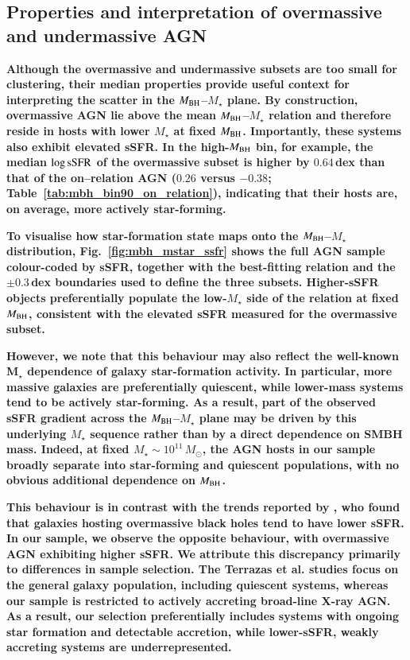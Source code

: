\documentclass{aa}
\begin{document}
\subsection{Properties and interpretation of overmassive and undermassive AGN}
\label{sec:over_under_props}

\textbf{Although the overmassive and undermassive subsets are too small for clustering, their median properties provide useful context for interpreting the scatter in the $M_{\rm BH}$--$M_\star$ plane. By construction, overmassive AGN lie above the mean $M_{\rm BH}$--$M_\star$ relation and therefore reside in hosts with lower $M_\star$ at fixed $M_{\rm BH}$. Importantly, these systems also exhibit elevated sSFR. In the high-$M_{\rm BH}$ bin, for example, the median $\log{\rm sSFR}$ of the overmassive subset is higher by $0.64$\,dex than that of the on--relation AGN ($0.26$ versus $-0.38$; Table~\ref{tab:mbh_bin90_on_relation}), indicating that their hosts are, on average, more actively star-forming.}

\textbf{To visualise how star-formation state maps onto the $M_{\rm BH}$--$M_\star$ distribution, Fig.~\ref{fig:mbh_mstar_ssfr} shows the full AGN sample colour-coded by sSFR, together with the best-fitting relation and the $\pm0.3$\,dex boundaries used to define the three subsets. Higher-sSFR objects preferentially populate the low-$M_\star$ side of the relation at fixed $M_{\rm BH}$, consistent with the elevated sSFR measured for the overmassive subset.}

\textbf{However, we note that this behaviour may also reflect the well-known M$_\star$ dependence of galaxy star-formation activity. In particular, more massive galaxies are preferentially quiescent, while lower-mass systems tend to be actively star-forming. As a result, part of the observed sSFR gradient across the $M_{\rm BH}$--$M_\star$ plane may be driven by this underlying $M_\star$ sequence rather than by a direct dependence on SMBH mass. Indeed, at fixed $M_\star \sim 10^{11}\,M_\odot$, the AGN hosts in our sample broadly separate into star-forming and quiescent populations, with no obvious additional dependence on $M_{\rm BH}$.}

\textbf{This behaviour is in contrast with the trends reported by \citet{Terrazas2016, Terrazas2017}, who found that galaxies hosting overmassive black holes tend to have lower sSFR. In our sample, we observe the opposite behaviour, with overmassive AGN exhibiting higher sSFR. We attribute this discrepancy primarily to differences in sample selection. The Terrazas et al. studies focus on the general galaxy population, including quiescent systems, whereas our sample is restricted to actively accreting broad-line X-ray AGN. As a result, our selection preferentially includes systems with ongoing star formation and detectable accretion, while lower-sSFR, weakly accreting systems are underrepresented.} 
\end{document}
